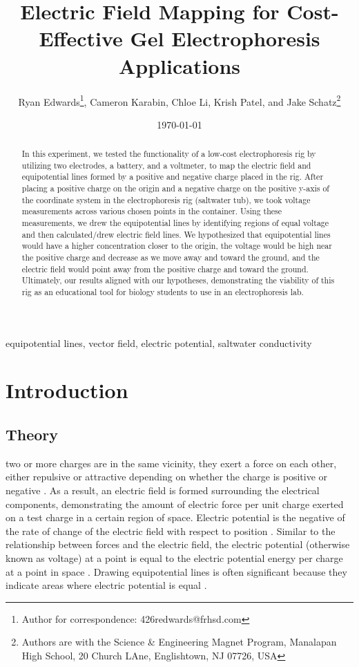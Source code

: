\documentclass[10pt,journal,twoside]{IEEEtran}
\title{Electric Field Mapping for Cost-Effective Gel Electrophoresis Applications}
\author{Ryan Edwards\thanks{Author for correspondence: 426redwards@frhsd.com}, Cameron Karabin, Chloe Li, Krish Patel, and Jake Schatz\thanks{Authors are with the Science \& Engineering Magnet Program, Manalapan High School, 20 Church LAne, Englishtown, NJ 07726, USA}}
\date{\today}
\newcommand{\keywords}{equipotential lines, vector field, electric potential, saltwater conductivity}
\begin{document}
\maketitle

\begin{abstract}
In this experiment, we tested the functionality of a low-cost electrophoresis rig by utilizing two electrodes, a battery, and a voltmeter, to map the electric field and equipotential lines formed by a positive and negative charge placed in the rig. After placing a positive charge on the origin and a negative charge on the positive y-axis of the coordinate system in the electrophoresis rig (saltwater tub), we took voltage measurements across various chosen points in the container. Using these measurements, we drew the equipotential lines by identifying regions of equal voltage and then calculated/drew electric field lines. We hypothesized that equipotential lines would have a higher concentration closer to the origin, the voltage would be high near the positive charge and decrease as we move away and toward the ground, and the electric field would point away from the positive charge and toward the ground. Ultimately, our results aligned with our hypotheses, demonstrating the viability of this rig as an educational tool for biology students to use in an electrophoresis lab.
\end{abstract}

\begin{IEEEkeywords}
\keywords
\end{IEEEkeywords}





\section{Introduction}
\subsection{Theory}
 two or more charges are in the same vicinity, they exert a force on each other, either repulsive or attractive depending on whether the charge is positive or negative \cite{tipler}. As a result, an electric field is formed surrounding the electrical components, demonstrating the amount of electric force per unit charge exerted on a test charge in a certain region of space. Electric potential is the negative of the rate of change of the electric field with respect to position \cite{tipler}. Similar to the relationship between forces and the electric field, the electric potential (otherwise known as voltage) at a point is equal to the electric potential energy per charge at a point in space \cite{tipler}. Drawing equipotential lines is often significant because they indicate areas where electric potential is equal \cite{cantt-2013-equipotential,fongsuwan-2019-system}.
\end{document}
